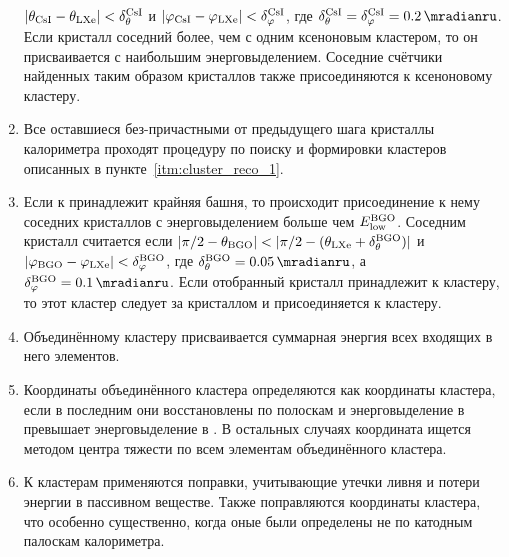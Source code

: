 \begin{enumerate}
    $ | \theta_{\ce{CsI}} - \theta_{\ce{LXe}} | < \delta_\theta^{\ce{CsI}} $
    и
    $ | \varphi_{\ce{CsI}} - \varphi_{\ce{LXe}} | < \delta_\varphi^{\ce{CsI}} $,
    где $\delta_\theta^{\ce{CsI}} = \delta_\varphi^{\ce{CsI}} = \SI{0.2}{\mradianru}$.
    Если кристалл соседний более,
    чем с одним ксеноновым кластером,
    то он присваивается  с наибольшим энерговыделением.
    Соседние счётчики найденных таким образом кристаллов также присоединяются к ксеноновому кластеру.
    \item Все оставшиеся без-причастными от предыдущего шага кристаллы  калориметра проходят процедуру по поиску и формировки кластеров описанных в пункте~\ref{itm:cluster_reco_1}.
    \item Если к  принадлежит крайняя башня,
    то происходит присоединение к нему соседних кристаллов  
    с энерговыделением больше чем $E_{\text{low}}^{\ce{BGO}}$.
    Соседним кристалл считается если
    $ | \pi/2 - \theta_{\ce{BGO}} | < | \pi/2 - (\theta_{\ce{LXe}} + \delta_{\theta}^{\ce{BGO}}) | $
    и
    $ | \varphi_{\ce{BGO}} - \varphi_{\ce{LXe}} | < \delta_\varphi^{\ce{BGO}} $,
    где $\delta_\theta^{\ce{BGO}} = \SI{0.05}{\mradianru}$,
    а $\delta_\varphi^{\ce{BGO}} = \SI{0.1}{\mradianru}$.
    Если отобранный  кристалл принадлежит к  кластеру,
    то этот кластер следует за кристаллом и присоединяется к  кластеру.
    \item Объединённому кластеру присваивается суммарная энергия всех входящих в него элементов.
    \item Координаты объединённого кластера определяются как координаты  кластера,
    если в последним они восстановлены по полоскам и энерговыделение в  превышает
    энерговыделение в .
    В остальных случаях координата ищется методом центра тяжести по всем элементам объединённого кластера.
    \item К кластерам применяются поправки,
    учитывающие утечки ливня и потери энергии в пассивном веществе.
    Также поправляются координаты кластера,
    что особенно существенно,
    когда оные были определены не по катодным палоскам  калориметра.
\end{enumerate}






